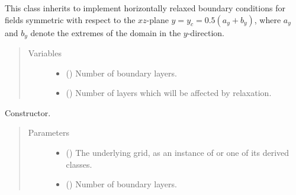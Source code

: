 \documentclass[letterpaper,10pt,english]{sphinxmanual}
\begin{document}
\begin{fulllineitems}
\label{\detokenize{api:dycore.horizontal_boundary.RelaxedSymmetricXZ}}
This class inherits {\hyperref[\detokenize{api:dycore.horizontal_boundary.Relaxed}]{}} to implement horizontally relaxed boundary conditions
for fields symmetric with respect to the \(xz\)-plane \(y = y_c = 0.5 (a_y + b_y)\),
where \(a_y\) and \(b_y\) denote the extremes of the domain in the \(y\)-direction.
\begin{quote}\begin{description}
\item[{Variables}] \leavevmode\begin{itemize}
\item {} 
{\hyperref[\detokenize{api:dycore.isentropic_prognostic.IsentropicPrognostic.nb}]{}} () \textendash{} Number of boundary layers.

\item {} 
 () \textendash{} Number of layers which will be affected by relaxation.

\end{itemize}

\end{description}\end{quote}

\begin{fulllineitems}
\label{\detokenize{api:dycore.horizontal_boundary.RelaxedSymmetricXZ.__init__}}
Constructor.
\begin{quote}\begin{description}
\item[{Parameters}] \leavevmode\begin{itemize}
\item {} 
 () \textendash{} The underlying grid, as an instance of {\hyperref[\detokenize{api:grids.xyz_grid.XYZGrid}]{}} or one of
its derived classes.

\item {} 
 () \textendash{} Number of boundary layers.


\end{itemize}
\end{description}
\end{quote}
\end{fulllineitems}
\end{fulllineitems}
\end{document}
